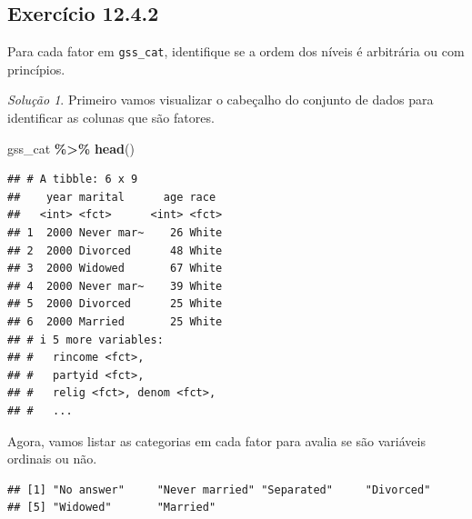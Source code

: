 \documentclass[
]{latex/krantz}
\newenvironment{Shaded}{\begin{snugshade}}{\end{snugshade}}
\newcommand{\FunctionTok}[1]{\textcolor[rgb]{0.13,0.29,0.53}{\textbf{#1}}}
\newcommand{\NormalTok}[1]{#1}
\newcommand{\SpecialCharTok}[1]{\textcolor[rgb]{0.81,0.36,0.00}{\textbf{#1}}}
\theoremstyle{definition}
\theoremstyle{definition}
\theoremstyle{definition}
\theoremstyle{definition}
\theoremstyle{remark}
\newtheorem*{solution}{Solução}
\begin{document}
\hypertarget{exr12-4-2}{%
\subsection*{Exercício 12.4.2}\label{exr12-4-2}}

Para cada fator em \texttt{gss\_cat}, identifique se a ordem dos níveis é arbitrária ou com princípios.

\begin{solution}
Primeiro vamos visualizar o cabeçalho do conjunto de dados para identificar as colunas que são fatores.

\begin{Shaded}
\begin{Highlighting}[]
\NormalTok{gss\_cat }\SpecialCharTok{\%\textgreater{}\%}
  \FunctionTok{head}\NormalTok{()}
\end{Highlighting}
\end{Shaded}

\begin{verbatim}
## # A tibble: 6 x 9
##    year marital      age race 
##   <int> <fct>      <int> <fct>
## 1  2000 Never mar~    26 White
## 2  2000 Divorced      48 White
## 3  2000 Widowed       67 White
## 4  2000 Never mar~    39 White
## 5  2000 Divorced      25 White
## 6  2000 Married       25 White
## # i 5 more variables:
## #   rincome <fct>,
## #   partyid <fct>,
## #   relig <fct>, denom <fct>,
## #   ...
\end{verbatim}

Agora, vamos listar as categorias em cada fator para avalia se são variáveis ordinais ou não.

\begin{Shaded}
\end{Shaded}

\begin{verbatim}
## [1] "No answer"     "Never married" "Separated"     "Divorced"     
## [5] "Widowed"       "Married"
\end{verbatim}

\begin{Shaded}
\end{Shaded}


\end{solution}
\end{document}
